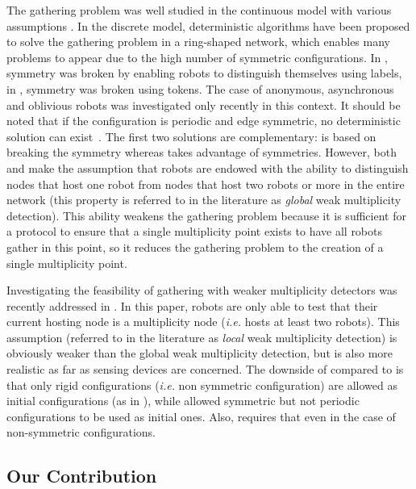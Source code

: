 \documentclass[11pt]{article}
\begin{document}
The gathering problem was well studied in the continuous model with various assumptions \cite{Ciel03,Ciel04,Flocchin05,Prencipe05}. In the discrete model, deterministic algorithms have been proposed to solve the gathering problem in a ring-shaped network, which enables many problems to appear due to the high number of symmetric configurations. In \cite{Marco06,Kowalski04,Dessmark06}, symmetry was broken by enabling robots to distinguish themselves using labels, in \cite{Flocchin04}, symmetry was broken using tokens. The case of anonymous, asynchronous and oblivious robots was investigated only recently in this context. It should be noted that if the configuration is periodic and edge symmetric, no deterministic solution can exist~\cite{Klasing06}. The first two solutions \cite{Klasing06,Klasing08} are complementary: \cite{Klasing06} is based on breaking the symmetry whereas \cite{Klasing08} takes advantage of symmetries. However, both \cite{Klasing06} and \cite{Klasing08} make the assumption that robots are endowed with the ability to distinguish nodes that host one robot from nodes that host two robots or more in the entire network (this property is referred to in the literature as \emph{global} weak multiplicity detection). This ability weakens the gathering problem because it is sufficient for a protocol to ensure that a single multiplicity point exists to have all robots gather in this point, so it reduces the gathering problem to the creation of a single multiplicity point.

Investigating the feasibility of gathering with weaker multiplicity detectors was recently addressed in \cite{Izumi10}. In this paper, robots are only able to test that their current hosting node is a multiplicity node (\emph{i.e.} hosts at least two robots). This assumption (referred to in the literature as \emph{local} weak multiplicity detection) is obviously weaker than the global weak multiplicity detection, but is also more realistic as far as sensing devices are concerned. The downside of \cite{Izumi10} compared to \cite{Klasing08} is that only rigid configurations (\emph{i.e.} non symmetric configuration) are allowed as initial configurations (as in  \cite{Klasing06}), while \cite{Klasing08} allowed symmetric but not periodic configurations to be used as initial ones. Also, \cite{Izumi10} requires that  even in the case of non-symmetric configurations.

\subsection{Our Contribution}
\end{document}
